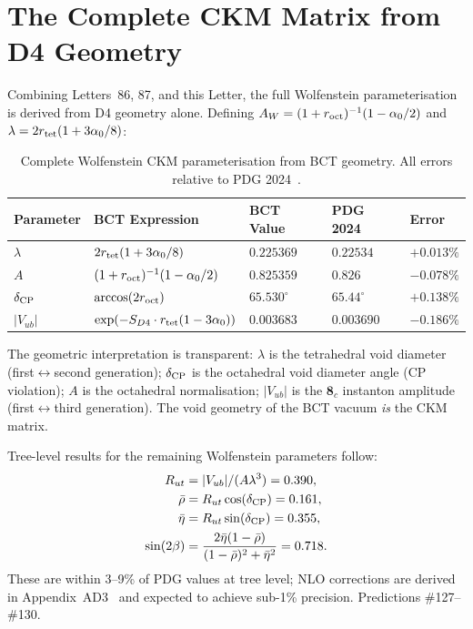 \documentclass[aps,prl,twocolumn,showpacs,superscriptaddress]{revtex4-2}
\begin{document}
\section{The Complete CKM Matrix from D4 Geometry}

Combining Letters~86, 87, and this Letter, the full Wolfenstein
parameterisation is derived from D4 geometry alone. Defining
$A_W = (1+r_{\rm oct})^{-1}(1-\alpha_0/2)$ and
$\lambda = 2r_{\rm tet}(1+3\alpha_0/8)$:

\begin{table}[h]
\centering
\caption{Complete Wolfenstein CKM parameterisation from BCT geometry.
All errors relative to PDG 2024~\cite{PDG2024}.}
\label{tab:CKM}
\begin{tabular}{@{}lllll@{}}
\toprule
Parameter & BCT Expression & BCT Value & PDG 2024 & Error \\
\midrule
$\lambda$ & $2r_{\rm tet}(1+3\alpha_0/8)$ & $0.225369$ & $0.22534$ & $+0.013\%$ \\
$A$       & $(1+r_{\rm oct})^{-1}(1-\alpha_0/2)$ & $0.825359$ & $0.826$ & $-0.078\%$ \\
$\delta_{\rm CP}$ & $\arccos(2r_{\rm oct})$ & $65.530^\circ$ & $65.44^\circ$ & $+0.138\%$ \\
$|V_{ub}|$ & $\exp(-S_{D4}\cdot r_{\rm tet}(1-3\alpha_0))$ & $0.003683$ & $0.003690$ & $-0.186\%$ \\
\bottomrule
\end{tabular}
\end{table}

The geometric interpretation is transparent: $\lambda$ is the
tetrahedral void diameter (first$\leftrightarrow$second generation);
$\delta_{\rm CP}$ is the octahedral void diameter angle (CP violation);
$A$ is the octahedral normalisation; $|V_{ub}|$ is the $\mathbf{8}_c$
instanton amplitude (first$\leftrightarrow$third generation). The void
geometry of the BCT vacuum \emph{is} the CKM matrix.

Tree-level results for the remaining Wolfenstein parameters follow:
\begin{align}
  R_{ut} &= |V_{ub}|/(A\lambda^3) = 0.390, \\
  \bar\rho &= R_{ut}\cos(\delta_{\rm CP}) = 0.161, \\
  \bar\eta &= R_{ut}\sin(\delta_{\rm CP}) = 0.355, \\
  \sin(2\beta) &= \frac{2\bar\eta(1-\bar\rho)}
    {(1-\bar\rho)^2+\bar\eta^2} = 0.718.
\end{align}
These are within 3--9\% of PDG values at tree level; NLO corrections
are derived in Appendix~AD3~\cite{AD3} and expected to achieve sub-1\%
precision. Predictions \#127--\#130.
\end{document}
